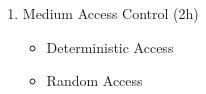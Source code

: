 \documentclass[xcolor=dvipsnames,aspectratio=169]{beamer}
\begin{document}
{\begin{enumerate}
            \begin{itemize}
                \item Interference Channel
                \item Relay Channel and multi-hop
            \end{itemize}
        \item Medium Access Control (2h)
            \begin{itemize}
                \item Deterministic Access
                \item Random Access

\end{itemize}
\end{enumerate}}
\end{document}
